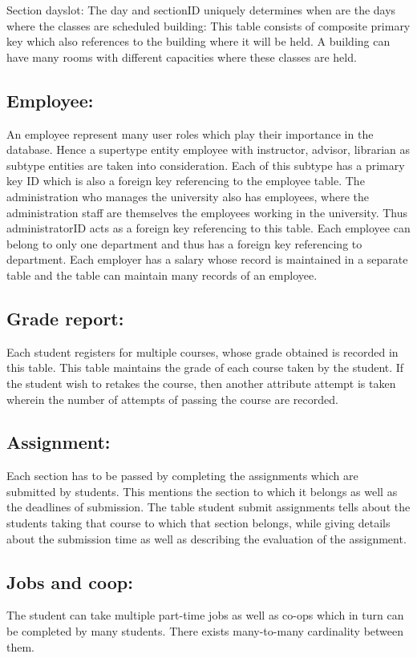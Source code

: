 \documentclass[12pt,letterpaper]{article}
\begin{document}
 Section dayslot: The day and sectionID uniquely determines when are the days where the classes are scheduled building: This table consists of composite primary key which also references to the building where it will be held. A building can have many rooms with different capacities where these classes are held. 

\subsection{Employee:} An employee represent many user roles which play their importance in the database. Hence a supertype entity employee with instructor, advisor, librarian as subtype entities are taken into consideration. Each of this subtype has a primary key ID which is also a foreign key referencing to the employee table. The administration who manages the university also has employees, where the administration staff are themselves the employees working in the university. Thus administratorID acts as a foreign key referencing to this table. Each employee can belong to only one department and thus has a foreign key referencing to department. Each employer has a salary whose record is maintained in a separate table and the table can maintain many records of an employee.

\subsection{Grade report:}Each student registers for multiple courses, whose grade obtained is recorded in this table. This table maintains the grade of each course taken by the student. If the student wish to retakes the course, then another attribute attempt is taken wherein the number of attempts of passing the course are recorded.

\subsection{Assignment:} Each section has to be passed by completing the assignments which are submitted by students. This mentions the section to which it belongs as well as the deadlines of submission. The table student submit assignments tells about the students taking that course to which that section belongs, while giving details about the submission time as well as describing the evaluation of the assignment. 

\subsection{Jobs and coop:} The student can take multiple part-time jobs as well as co-ops which in turn can be completed by many students. There exists many-to-many cardinality between them. 
\end{document}
